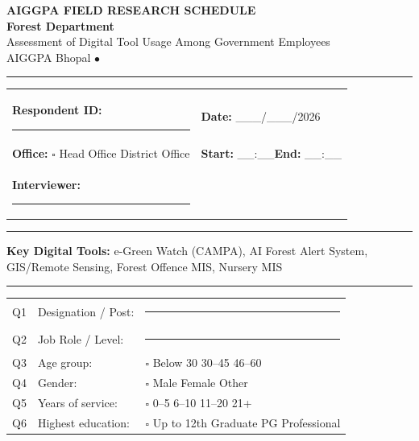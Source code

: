 \documentclass[10pt,a4paper]{article}
\newcommand{\blank}{\rule{8cm}{0.4pt}}
\begin{document}
\begin{center}
{\Large\bfseries AIGGPA FIELD RESEARCH SCHEDULE}\\[3pt]
{\large\bfseries Forest Department}\\[3pt]
{\small Assessment of Digital Tool Usage Among Government Employees}\\[2pt]
{\small AIGGPA Bhopal \quad$\bullet$}
\end{center}
\vspace{4pt}\noindent\rule{\textwidth}{1pt}\vspace{4pt}
\noindent\begin{tabularx}{\textwidth}{@{}L{7cm} L{7cm}@{}}
\textbf{Respondent ID:} \blank & \textbf{Date:} \_\_\_/\_\_\_/2026 \\[3pt]
\textbf{Office:} {\Large$\square$} Head Office\quad{\Large$\square$} District Office & \textbf{Start:} \_\_:\_\_\quad\textbf{End:} \_\_:\_\_ \\[3pt]
\textbf{Interviewer:} \blank & \\
\end{tabularx}
\vspace{4pt}\noindent\rule{\textwidth}{0.5pt}\vspace{4pt}

\noindent\textbf{Key Digital Tools:} e-Green Watch (CAMPA), AI Forest Alert System, GIS/Remote Sensing, Forest Offence MIS, Nursery MIS

\vspace{3pt}

\vspace{4pt}\noindent\rule{\textwidth}{0.5pt}

\vspace{3pt}
\vspace{4pt}

\noindent\begin{tabularx}{\textwidth}{@{}L{0.6cm} L{7.5cm} X@{}}
Q1 & Designation / Post: & \blank \\[3pt]
Q2 & Job Role / Level: & \blank \\[3pt]
Q3 & Age group: & {\Large$\square$} Below 30\quad{\Large$\square$} 30--45\quad{\Large$\square$} 46--60 \\[3pt]
Q4 & Gender: & {\Large$\square$} Male\quad{\Large$\square$} Female\quad{\Large$\square$} Other \\[3pt]
Q5 & Years of service: & {\Large$\square$} 0--5\quad{\Large$\square$} 6--10\quad{\Large$\square$} 11--20\quad{\Large$\square$} 21+ \\[3pt]
Q6 & Highest education: & {\Large$\square$} Up to 12th\quad{\Large$\square$} Graduate\quad{\Large$\square$} PG\quad{\Large$\square$} Professional \\
\end{tabularx}
\end{document}
